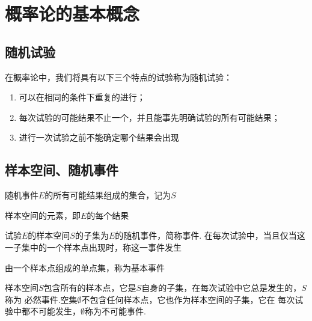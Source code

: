 \section{概率论的基本概念}

\subsection{随机试验}

\begin{definition}[随机试验]
  在概率论中，我们将具有以下三个特点的试验称为随机试验：
  \begin{enumerate}
    \item 可以在相同的条件下重复的进行；
    \item 每次试验的可能结果不止一个，并且能事先明确试验的所有可能结果；
    \item 进行一次试验之前不能确定哪个结果会出现
  \end{enumerate}
\end{definition}

\subsection{样本空间、随机事件}

\begin{definition}[样本空间]
  随机事件$E$的所有可能结果组成的集合，记为$S$
\end{definition}

\begin{definition}[样本点]
  样本空间的元素，即$E$的每个结果
\end{definition}

\begin{definition}[随机事件]
  试验$E$的样本空间$S$的子集为$E$的随机事件，简称{\heiti 事件}.
  在每次试验中，当且仅当这一子集中的一个样本点出现时，称这一{\heiti 事件发生}
\end{definition}

\begin{definition}[基本事件]
  由一个样本点组成的单点集，称为基本事件
\end{definition}

\begin{definition}[必然事件和不可能事件]
  样本空间$S$包含所有的样本点，它是$S$自身的子集，在每次试验中它总是发生的，$S$称为
  {\heiti 必然事件}.空集$\emptyset$不包含任何样本点，它也作为样本空间的子集，它在
  每次试验中都不可能发生，$\emptyset$称为{\heiti 不可能事件}.
\end{definition}


